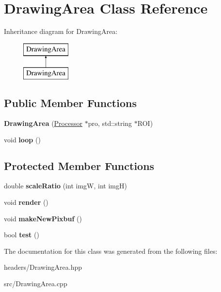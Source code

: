 \hypertarget{classDrawingArea}{\section{Drawing\-Area Class Reference}
\label{classDrawingArea}
}
Inheritance diagram for Drawing\-Area\-:\begin{figure}[H]
\begin{center}
\leavevmode
\includegraphics[height=2.000000cm]{classDrawingArea}
\end{center}
\end{figure}
\subsection*{Public Member Functions}
\begin{DoxyCompactItemize}
\item 
\hypertarget{classDrawingArea_a4b84cb4d43b4cd64ffa3055525d1d52e}{{\bfseries Drawing\-Area} (\hyperlink{classProcessor}{Processor} $\ast$pro, std\-::string $\ast$R\-O\-I)}\label{classDrawingArea_a4b84cb4d43b4cd64ffa3055525d1d52e}

\item 
\hypertarget{classDrawingArea_a9a2d199506c09591e756045c55151eef}{void {\bfseries loop} ()}\label{classDrawingArea_a9a2d199506c09591e756045c55151eef}

\end{DoxyCompactItemize}
\subsection*{Protected Member Functions}
\begin{DoxyCompactItemize}
\item 
\hypertarget{classDrawingArea_a23196e37bb7fd9780601cc2c22abdae1}{double {\bfseries scale\-Ratio} (int img\-W, int img\-H)}\label{classDrawingArea_a23196e37bb7fd9780601cc2c22abdae1}

\item 
\hypertarget{classDrawingArea_a4b228965df0cdfe4df0bfe2d63ea868a}{void {\bfseries render} ()}\label{classDrawingArea_a4b228965df0cdfe4df0bfe2d63ea868a}

\item 
\hypertarget{classDrawingArea_a38dc7e682edc21fff94c79760d500122}{void {\bfseries make\-New\-Pixbuf} ()}\label{classDrawingArea_a38dc7e682edc21fff94c79760d500122}

\item 
\hypertarget{classDrawingArea_aed51b64e5b9c5a63f2a3b448eadbf611}{bool {\bfseries test} ()}\label{classDrawingArea_aed51b64e5b9c5a63f2a3b448eadbf611}

\end{DoxyCompactItemize}


The documentation for this class was generated from the following files\-:\begin{DoxyCompactItemize}
\item 
headers/Drawing\-Area.\-hpp\item 
src/Drawing\-Area.\-cpp\end{DoxyCompactItemize}

